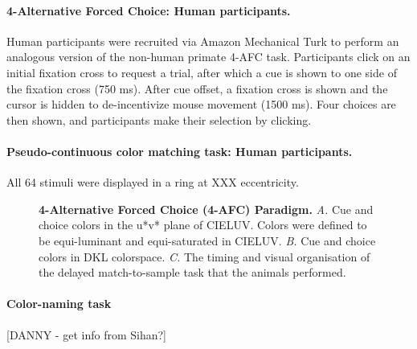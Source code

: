 \paragraph{4-Alternative Forced Choice: Human participants.} Human participants were recruited via Amazon Mechanical Turk to perform an analogous version of the non-human primate 4-AFC task. Participants click on an initial fixation cross to request a trial, after which a cue is shown to one side of the fixation cross (750 ms). After cue offset, a fixation cross is shown and the cursor is hidden to de-incentivize mouse movement (1500 ms). Four choices are then shown, and participants make their selection by clicking. 

\paragraph{Pseudo-continuous color matching task: Human participants.} All 64 stimuli were displayed in a ring at XXX eccentricity. 

\begin{figure}

\caption{\textbf{4-Alternative Forced Choice (4-AFC) Paradigm.}
\emph{A.} Cue and choice colors in the u*v* plane of CIELUV. Colors were defined to be equi-luminant and equi-saturated in CIELUV.
\emph{B.} Cue and choice colors in DKL colorspace.
\emph{C.} The timing and visual organisation of the delayed match-to-sample task that the animals performed.
} 
\label{fig:paradigm}
\end{figure}

\paragraph{Color-naming task} [DANNY - get info from Sihan?]




